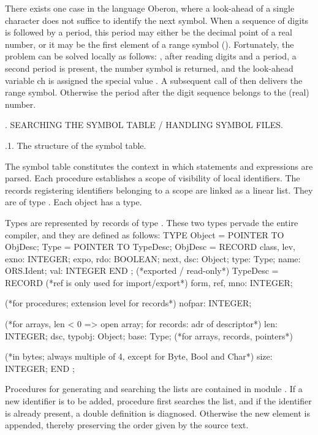 There exists one case in the language Oberon, where a look-ahead of a single character does not suffice to identify the next symbol. When a sequence of digits is followed by a period, this period may either be the decimal point of a real number, or it may be the first element of a range symbol (). Fortunately, the problem can be solved locally as follows: , after reading digits and a period, a second period is present, the number symbol is returned, and the look-ahead variable ch is assigned the special value . A subsequent call of  then delivers the range symbol. Otherwise the period after the digit sequence belongs to the (real) number.

\eject
{}. SEARCHING THE SYMBOL TABLE / HANDLING SYMBOL FILES.

.1. The structure of the symbol table.

The symbol table constitutes the context in which statements and expressions are parsed. Each procedure establishes a scope of visibility of local identifiers. The records registering identifiers belonging to a scope are linked as a linear list. They are of type . Each object has a type.

Types are represented by records of type . These two types pervade the entire compiler, and they are defined as follows:
\begintt
TYPE Object = POINTER TO ObjDesc;
  Type = POINTER TO TypeDesc;
  ObjDesc = RECORD
    class, lev, exno: INTEGER;
    expo, rdo: BOOLEAN; next, dsc: Object; type: Type;
    name: ORS.Ident; val: INTEGER
  END ;
  (*exported / read-only*)
  TypeDesc = RECORD
    (*ref is only used for import/export*)
    form, ref, mno: INTEGER;
    
    (*for procedures; extension level for records*)
    nofpar: INTEGER;

    (*for arrays, len < 0 => open array; for records:
      adr of descriptor*)
    len: INTEGER; 
    dsc, typobj: Object;
    base: Type; (*for arrays, records, pointers*)

    (*in bytes; always multiple of 4, except for Byte,
      Bool and Char*)
    size: INTEGER; 
  END ;
\endtt

\noindent Procedures for generating and searching the lists are contained in module . If a new identifier is to be added, procedure  first searches the list, and if the identifier is already present, a double definition is diagnosed. Otherwise the new element is appended, thereby preserving the order given by the source text.

